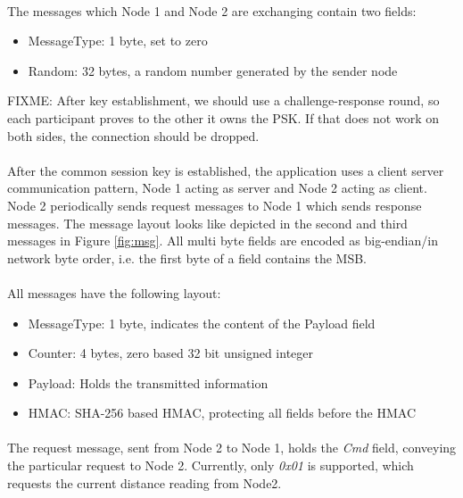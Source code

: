 \paragraph{}The messages which Node 1 and Node 2 are exchanging contain two fields:
\begin{itemize}
	\item MessageType: 1 byte, set to zero
	\item Random: 32 bytes, a random number generated by the sender node
\end{itemize}

FIXME: After key establishment, we should use a challenge-response round, so each participant proves to the other it owns the PSK. If that does not work on both sides, the connection should be dropped.

\paragraph{} After the common session key is established, the application uses a client server communication pattern, Node 1 acting as server and Node 2 acting as client. Node 2 periodically sends request messages to Node 1 which sends response messages. The message layout looks like depicted in the second and third messages in Figure \ref{fig:msg}. All multi byte fields are encoded as big-endian/in network byte order, i.e. the first byte of a field contains the MSB.

\paragraph{} All messages have the following layout:
\begin{itemize}
	\item MessageType: 1 byte, indicates the content of the Payload field
	\item Counter: 4 bytes, zero based 32 bit unsigned integer
	\item Payload: Holds the transmitted information
	\item HMAC: SHA-256 based HMAC, protecting all fields before the HMAC
\end{itemize}

\paragraph{} The request message, sent from Node 2 to Node 1, holds the \emph{Cmd} field, conveying the particular request to Node 2. Currently, only \emph{0x01} is supported, which requests the current distance reading from Node2.

